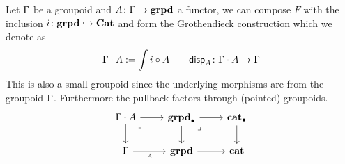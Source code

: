 \begin{defn}
  Let $\Gamma$ be a groupoid and $A \colon \Gamma \to \mathbf{grpd}$ a functor,
  we can compose $F$ with the inclusion $i \colon \mathbf{grpd} \hookrightarrow \mathbf{Cat}$
  and form the Grothendieck construction which we denote as
  \[ \Gamma \cdot A := \int i \circ A \quad \quad \mathsf{disp}_{A} \colon \Gamma \cdot A \to \Gamma\]
  This is also a small groupoid since the underlying morphisms are
  from the groupoid $\Gamma$.
  Furthermore the pullback factors through (pointed) groupoids.
  \[\begin{tikzcd}
    {\Ga \cdot A} & \ptgrpd & \ptcat \\
    \Ga & \grpd & \cat \\
    {}
    \arrow[from=1-1, to=1-2]
    \arrow[from=1-1, to=2-1]
    \arrow["\lrcorner"{anchor=center, pos=0.125}, draw=none, from=1-1, to=2-2]
    \arrow[from=1-2, to=1-3]
    \arrow[from=1-2, to=2-2]
    \arrow["\lrcorner"{anchor=center, pos=0.125}, draw=none, from=1-2, to=2-3]
    \arrow[from=1-3, to=2-3]
    \arrow["A"', from=2-1, to=2-2]
    \arrow[from=2-2, to=2-3]
  \end{tikzcd}\]
\end{defn}

\medskip

